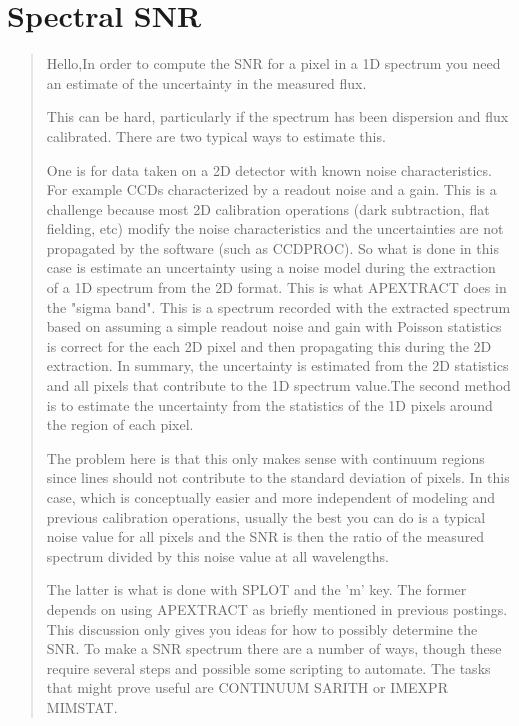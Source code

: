 \section{Spectral SNR} \label{sec:Spectral SNR}
\begin{quote}


Hello,In order to compute the SNR for a pixel in a 1D spectrum you
need an estimate of the uncertainty in the measured flux. 

This can be hard, particularly if the spectrum has been dispersion and
flux calibrated. There are two typical ways to estimate this.

One is for data taken on a 2D detector with known noise
characteristics. For example CCDs characterized by a readout noise and
a gain. This is a challenge because most 2D calibration operations
(dark subtraction, flat fielding, etc) modify the noise
characteristics and the uncertainties are not propagated by the
software (such as CCDPROC). So what is done in this case is estimate
an uncertainty using a noise model during the extraction of a 1D
spectrum from the 2D format. This is what APEXTRACT does in the "sigma
band". This is a spectrum recorded with the extracted spectrum based
on assuming a simple readout noise and gain with Poisson statistics is
correct for the each 2D pixel and then propagating this during the 2D
extraction. In summary, the uncertainty is estimated from the 2D
statistics and all pixels that contribute to the 1D spectrum value.The
second method is to estimate the uncertainty from the statistics of
the 1D pixels around the region of each pixel. 

The problem here is that this only makes sense with continuum regions
since lines should not contribute to the standard deviation of
pixels. In this case, which is conceptually easier and more
independent of modeling and previous calibration operations, usually
the best you can do is a typical noise value for all pixels and the
SNR is then the ratio of the measured spectrum divided by this noise
value at all wavelengths.

The latter is what is done with SPLOT and the 'm' key. The former
depends on using APEXTRACT as briefly mentioned in previous
postings. This discussion only gives you ideas for how to possibly
determine the SNR. To make a SNR spectrum there are a number of ways,
though these require several steps and possible some scripting to
automate. The tasks that might prove useful are CONTINUUM SARITH or
IMEXPR MIMSTAT.


\end{quote}
